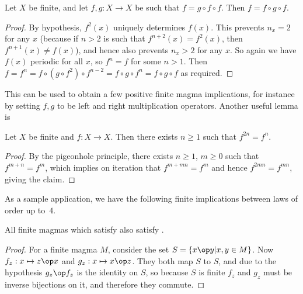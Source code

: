 \begin{lemma}\label{gff}  \leanok Let $X$ be finite, and let $f, g: X \to X$ be such that $f = g \circ f \circ f$.  Then $f = f \circ g \circ f$.
\end{lemma}

\begin{proof} \leanok By hypothesis, $f^2(x)$ uniquely determines $f(x)$.  This prevents $n_x = 2$ for any $x$ (because if $n>2$ is such that $f^{n+2}(x) = f^2(x)$, then $f^{n+1}(x) \neq f(x)$), and hence also prevents $n_x > 2$ for any $x$.   So again we have $f(x)$ periodic for all $x$, so $f^n = f$ for some $n>1$.  Then $f = f^n = f \circ (g \circ f^2) \circ f^{n-2} = f \circ g \circ f^n = f \circ g \circ f$ as required.
\end{proof}

This can be used to obtain a few positive finite magma implications, for instance by setting $f,g$ to be left and right multiplication operators.  Another useful lemma is

\begin{lemma}\label{period}  \leanok  Let $X$ be finite and $f: X \to X$.  Then there exists $n \geq 1$ such that $f^{2n} = f^n$.
\end{lemma}

\begin{proof} \leanok By the pigeonhole principle, there exists $n \geq 1$, $m \geq 0$ such that $f^{m+n} = f^m$, which implies on iteration that $f^{m+mn} = f^m$ and hence $f^{2mn} = f^{mn}$, giving the claim.
\end{proof}

As a sample application, we have the following finite implications between laws of order up to~$4$.

\begin{proposition}\label{finite_imp_3994_3588_thm}
  \leanok
  All finite magmas which satisfy  also satisfy .
\end{proposition}

\begin{proof}\label{finite_imp_3994_3588} \leanok
  For a finite magma $M$, consider the set $S = \{x \op y | x, y \in M\}$.
  Now $f_z : x \mapsto z \op x$ and $g_z : x \mapsto x \op z$.
  They both map $S$ to $S$, and due to the hypothesis $g_z \op f_z$ is the identity on $S$,
  so because $S$ is finite $f_z$ and $g_z$ must be inverse bijections on it, and therefore
  they commute.
\end{proof}

